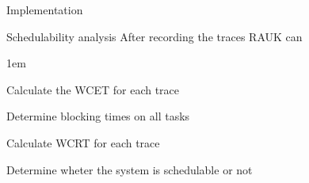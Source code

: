 \begin{frame}{Implementation}
    \begin{block}{Schedulability analysis}
        After recording the traces RAUK can
        \begin{itemize-size}{1em}
            \item Calculate the WCET for each trace
            \item Determine blocking times on all tasks
            \item Calculate WCRT for each trace
            \item Determine wheter the system is schedulable or not
        \end{itemize-size}  
    \end{block}
\end{frame}
